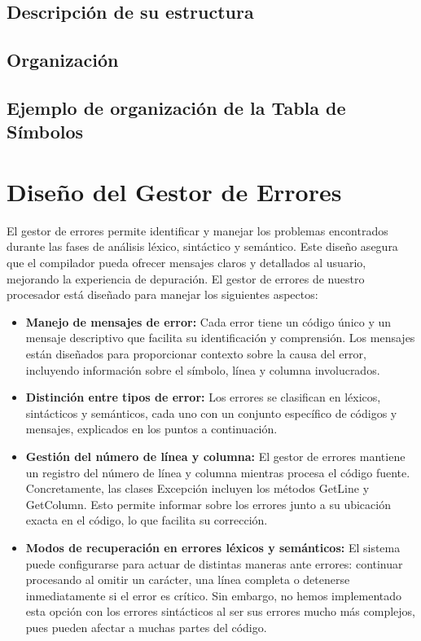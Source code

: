 \documentclass{article}
\begin{document}
\subsection{Descripción de su estructura}


\subsection{Organización}


\subsection{Ejemplo de organización de la Tabla de Símbolos}


\section{Diseño del Gestor de Errores}

El gestor de errores permite identificar y manejar los problemas encontrados durante las fases de análisis léxico, sintáctico y semántico. Este diseño asegura que el compilador pueda ofrecer mensajes claros y detallados al usuario, mejorando la experiencia de depuración. El gestor de errores de nuestro procesador está diseñado para manejar los siguientes aspectos:

\begin{itemize}
    \item \textbf{Manejo de mensajes de error:} Cada error tiene un código único y un mensaje descriptivo que facilita su identificación y comprensión. Los mensajes están diseñados para proporcionar contexto sobre la causa del error, incluyendo información sobre el símbolo, línea y columna involucrados.
    \item \textbf{Distinción entre tipos de error:} Los errores se clasifican en léxicos, sintácticos y semánticos, cada uno con un conjunto específico de códigos y mensajes, explicados en los puntos a continuación.
    \item \textbf{Gestión del número de línea y columna:} El gestor de errores mantiene un registro del número de línea y columna mientras procesa el código fuente. Concretamente, las clases Excepción incluyen los métodos GetLine y GetColumn. Esto permite informar sobre los errores junto a su ubicación exacta en el código, lo que facilita su corrección. 
    \item \textbf{Modos de recuperación en errores léxicos y semánticos:} El sistema puede configurarse para actuar de distintas maneras ante errores: continuar procesando al omitir un carácter, una línea completa o detenerse inmediatamente si el error es crítico. Sin embargo, no hemos implementado esta opción con los errores sintácticos al ser sus errores mucho más complejos, pues pueden afectar a muchas partes del código.
\end{itemize}
\end{document}
